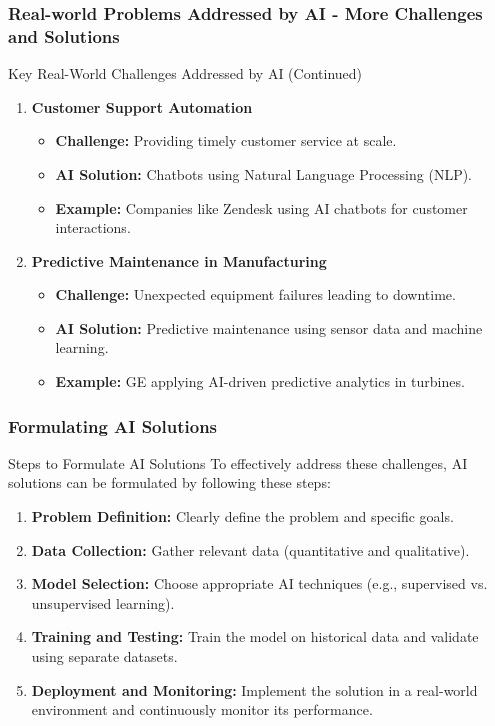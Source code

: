 \documentclass{beamer}
\begin{document}
\begin{frame}[fragile]
    \frametitle{Real-world Problems Addressed by AI - More Challenges and Solutions}
    \begin{block}{Key Real-World Challenges Addressed by AI (Continued)}
        \begin{enumerate}[resume]
            \item \textbf{Customer Support Automation}
                \begin{itemize}
                    \item \textbf{Challenge:} Providing timely customer service at scale.
                    \item \textbf{AI Solution:} Chatbots using Natural Language Processing (NLP).
                    \item \textbf{Example:} Companies like Zendesk using AI chatbots for customer interactions.
                \end{itemize}
            \item \textbf{Predictive Maintenance in Manufacturing}
                \begin{itemize}
                    \item \textbf{Challenge:} Unexpected equipment failures leading to downtime.
                    \item \textbf{AI Solution:} Predictive maintenance using sensor data and machine learning.
                    \item \textbf{Example:} GE applying AI-driven predictive analytics in turbines.
                \end{itemize}
        \end{enumerate}
    \end{block}
\end{frame}

\begin{frame}[fragile]
    \frametitle{Formulating AI Solutions}
    \begin{block}{Steps to Formulate AI Solutions}
        To effectively address these challenges, AI solutions can be formulated by following these steps:
        \begin{enumerate}
            \item \textbf{Problem Definition:} Clearly define the problem and specific goals.
            \item \textbf{Data Collection:} Gather relevant data (quantitative and qualitative).
            \item \textbf{Model Selection:} Choose appropriate AI techniques (e.g., supervised vs. unsupervised learning).
            \item \textbf{Training and Testing:} Train the model on historical data and validate using separate datasets.
            \item \textbf{Deployment and Monitoring:} Implement the solution in a real-world environment and continuously monitor its performance.
        \end{enumerate}
    \end{block}
\end{frame}
\end{document}
